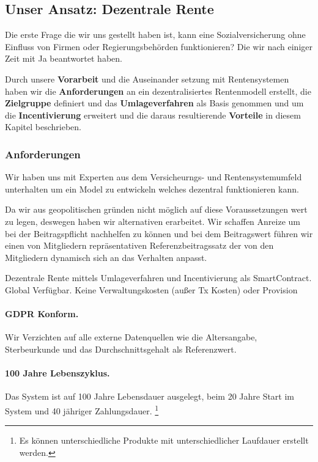 \subsection{Unser Ansatz: Dezentrale Rente}

Die erste Frage die wir uns gestellt haben ist, kann eine Sozialversicherung ohne Einfluss von Firmen oder Regierungsbehörden funktionieren? Die wir nach einiger Zeit mit Ja beantwortet haben.

Durch unsere \textbf{Vorarbeit} und die Auseinander setzung mit Rentensystemen haben wir die \textbf{Anforderungen} an ein dezentralisiertes Rentenmodell erstellt, die  \textbf{Zielgruppe} definiert und das \textbf{Umlageverfahren} als Basis genommen und um die \textbf{Incentivierung} erweitert und die daraus resultierende \textbf{Vorteile} in diesem Kapitel beschrieben.

\subsubsection{Anforderungen}
Wir haben uns mit Experten aus dem Versicheurngs- und Rentensystemumfeld unterhalten um ein Model zu entwickeln welches dezentral funktionieren kann.

Da wir aus geopolitischen gründen nicht möglich auf diese Voraussetzungen wert zu legen, deswegen haben wir alternativen erarbeitet.
Wir schaffen Anreize um bei der Beitragspflicht nachhelfen zu können und bei dem Beitragswert führen wir einen von Mitgliedern repräsentativen Referenzbeitragssatz der von den Mitgliedern dynamisch sich an das Verhalten anpasst.

Dezentrale Rente mittels Umlageverfahren und Incentivierung als SmartContract.
Global Verfügbar. Keine Verwaltungskosten (außer Tx Kosten) oder Provision

\paragraph{GDPR\cite{gdpr} Konform.} Wir Verzichten auf alle externe Datenquellen wie die Altersangabe, Sterbeurkunde und das Durchschnittsgehalt als Referenzwert.

\paragraph{100 Jahre Lebenszyklus.} Das System ist auf 100 Jahre Lebensdauer ausgelegt, beim 20 Jahre Start im System und 40 jähriger Zahlungsdauer. \footnote{ Es können unterschiedliche Produkte mit unterschiedlicher Laufdauer erstellt werden.} 

